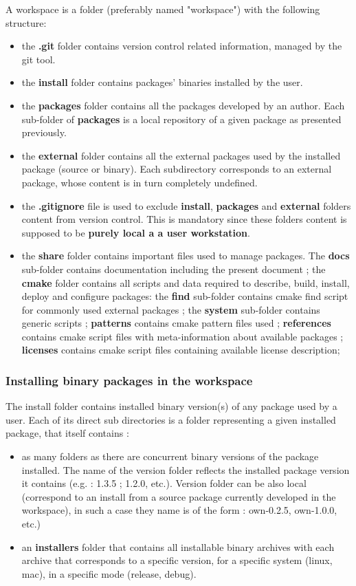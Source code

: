 \documentclass[12pt,a4paper]{article}
\begin{document}
A workspace is a folder (preferably named "workspace") with the following structure:
\begin{itemize}
\item the \textbf{.git} folder contains version control related information, managed by the git tool.

\item the \textbf{install} folder contains packages' binaries installed by the user. 
\item the \textbf{packages} folder contains all the packages developed by an author. Each sub-folder of \textbf{packages} is a local repository of a given package as presented previously.
\item the \textbf{external} folder contains all the external packages used by the installed package (source or binary). Each subdirectory corresponds to an external package, whose content is in turn completely undefined.
\item the \textbf{.gitignore} file is used to exclude  \textbf{install}, \textbf{packages} and \textbf{external} folders content from version control. This is mandatory since these folders content is supposed to be \textbf{ purely local a a user workstation}.
\item the \textbf{share} folder contains important files used to manage packages. The \textbf{docs} sub-folder contains documentation including the present document ; the \textbf{cmake} folder contains all scripts and data required to describe, build, install, deploy and configure packages: the \textbf{find} sub-folder contains cmake find script for commonly used external packages ; the \textbf{system} sub-folder contains generic scripts ; \textbf{patterns} contains cmake pattern files used ; \textbf{references} contains cmake script files with meta-information about available packages ; \textbf{licenses} contains cmake script files containing available license description; 
\end{itemize}

\subsubsection{Installing binary packages in the workspace}

The install folder contains installed binary version(s) of any package used by a user. Each of its direct sub directories is a folder representing a given installed package, that itself contains :
\begin{itemize}
\item as many folders as there are concurrent binary versions of the package installed. The name of the version folder reflects the installed package version it contains (e.g. : 1.3.5 ; 1.2.0, etc.). Version folder can be also local (correspond to an install from a source package currently developed in the workspace), in such a case they name is of the form : own-0.2.5, own-1.0.0, etc.)
\item an \textbf{installers} folder that contains all installable binary archives with each archive that corresponds to a specific version, for a specific system (linux, mac), in a specific mode (release, debug).
\end{itemize}
\end{document}
